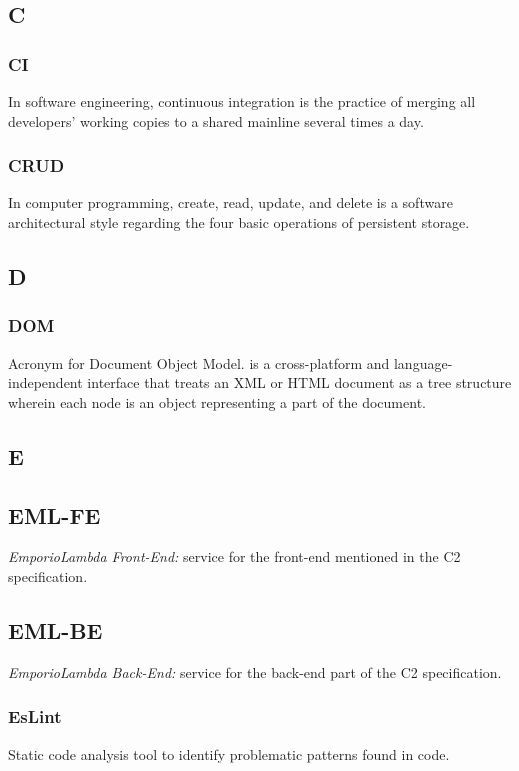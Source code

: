 \subsection*{C}
\subsubsection*{CI}
In software engineering, continuous integration is the practice of merging all developers' working 
copies to a shared mainline several times a day.

\subsubsection*{CRUD}
In computer programming, create, read, update, and delete is a software architectural style 
regarding the four basic operations of persistent storage.

\subsection*{D}
\subsubsection*{DOM}
Acronym for Document Object Model. is a cross-platform and language-independent interface that 
treats an XML or HTML document as a tree structure wherein each node is an object representing 
a part of the document.


\subsection*{E}

\subsection*{EML-FE}
\textit{EmporioLambda Front-End:} service for the front-end mentioned in the C2 specification.

\subsection*{EML-BE}
\textit{EmporioLambda Back-End:} service for the back-end part of the C2 specification.

\subsubsection*{EsLint}
Static code analysis tool to identify problematic patterns found in 
code.

